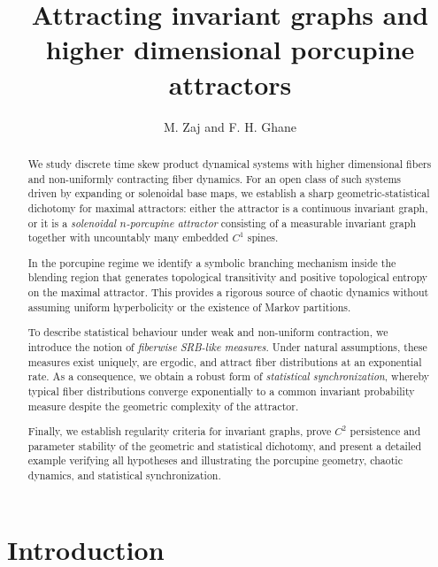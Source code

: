 \documentclass[11pt,reqno]{amsart}
\title[Attracting invariant graphs and porcupine attractors]{Attracting invariant graphs and higher dimensional porcupine attractors}
\author[Zaj and Ghane]{M. Zaj  and F. H. Ghane}
\theoremstyle{plain}
\newtheorem*{theorem A}{Theorem A}
\newtheorem*{theorem B}{Theorem B}
\newtheorem*{theorem C}{Theorem C}
\newtheorem*{theorem 1}{Theorem 1}
\newtheorem*{theorem 2}{Theorem 2}
\newtheorem*{theorem 3}{Theorem 3}
\numberwithin{equation}{section}
\begin{document}
\begin{abstract}
We study discrete time skew product dynamical systems with higher dimensional fibers and
non-uniformly contracting fiber dynamics.
For an open class of such systems driven by expanding or solenoidal base maps, we establish a
sharp geometric-statistical dichotomy for maximal attractors: either the attractor is a
continuous invariant graph, or it is a \emph{solenoidal $n$-porcupine attractor} consisting of
a measurable invariant graph together with uncountably many embedded $C^{1}$ spines.

In the porcupine regime we identify a symbolic branching mechanism inside the blending region
that generates topological transitivity and positive topological entropy on the maximal
attractor.
This provides a rigorous source of chaotic dynamics without assuming uniform hyperbolicity or
the existence of Markov partitions.

To describe statistical behaviour under weak and non-uniform contraction, we introduce the
notion of \emph{fiberwise SRB-like measures}.
Under natural assumptions, these measures exist uniquely, are ergodic, and attract fiber
distributions at an exponential rate.
As a consequence, we obtain a robust form of \emph{statistical synchronization}, whereby
typical fiber distributions converge exponentially to a common invariant probability measure
despite the geometric complexity of the attractor.

Finally, we establish regularity criteria for invariant graphs, prove $C^{2}$ persistence and
parameter stability of the geometric and statistical dichotomy, and present a detailed example
verifying all hypotheses and illustrating the porcupine geometry, chaotic dynamics, and
statistical synchronization.
\end{abstract}

\maketitle
\thispagestyle{empty}
\tableofcontents



\section{Introduction}
\end{document}
